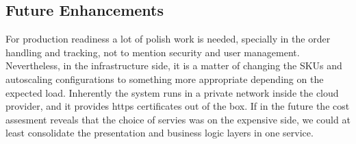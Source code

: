 \documentclass{llncs}
\begin{document}
\subsection{Future Enhancements}
For production readiness a lot of polish work is needed, specially in the order handling and tracking, not to mention security and user management.
Nevertheless, in the infrastructure side, it is a matter of changing the SKUs and autoscaling configurations to something more appropriate depending on the expected load.
Inherently the system runs in a private network inside the cloud provider, and it provides https certificates out of the box.
If in the future the cost assesment reveals that the choice of servies was on the expensive side, we could at least consolidate the presentation and business logic layers in one service.


\begin{thebibliography}{9}

\end{thebibliography}
\end{document}
